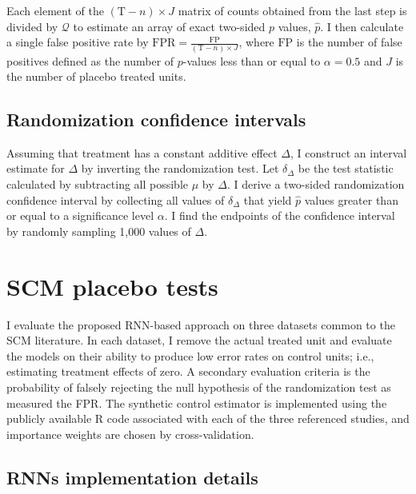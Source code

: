 \documentclass[hidelinks,12pt]{article}
\begin{document}
Each element of the $(\text{T}-n) \times J$ matrix of counts obtained from the last step is divided by $\mathcal{Q}$ to estimate an array of exact two-sided $p$ values, $\hat{p}$. I then calculate a single false positive rate by $\text{FPR} = \frac{\text{FP}}{(\text{T}-n) \times J}$, where $\text{FP}$ is the number of false positives defined as the number of $p$-values less than or equal to $\alpha=0.5$ and $J$ is the number of placebo treated units.

\subsection{Randomization confidence intervals}

Assuming that treatment has a constant additive effect $\Delta$, I construct an interval estimate for $\Delta$ by inverting the randomization test. Let $\delta_\Delta$ be the test statistic calculated by subtracting all possible $\mu$ by $\Delta$. I derive a two-sided randomization confidence interval by collecting all values of $\delta_\Delta$ that yield $\hat{p}$ values greater than or equal to a significance level $\alpha$. I find the endpoints of the confidence interval by randomly sampling 1,000 values of $\Delta$.

\section{SCM placebo tests} \label{placebo}

I evaluate the proposed RNN-based approach on three datasets common to the SCM literature. In each dataset, I remove the actual treated unit and evaluate the models on their ability to produce low error rates on control units; i.e., estimating treatment effects of zero. A secondary evaluation criteria is the probability of falsely rejecting the null hypothesis of the randomization test as measured the FPR. The synthetic control estimator is implemented using the publicly available \textsf{R} code associated with each of the three referenced studies, and importance weights are chosen by cross-validation. 

\subsection{RNNs implementation details}
\end{document}
